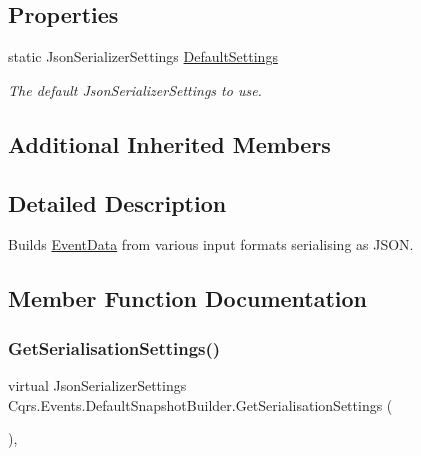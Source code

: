 \subsection*{Properties}
\begin{DoxyCompactItemize}
\item 
static Json\+Serializer\+Settings \hyperlink{classCqrs_1_1Events_1_1DefaultSnapshotBuilder_ab65162b37e4fff19014e145cf163f6ae_ab65162b37e4fff19014e145cf163f6ae}{Default\+Settings}
\begin{DoxyCompactList}\small\item\em The default Json\+Serializer\+Settings to use. \end{DoxyCompactList}\end{DoxyCompactItemize}
\subsection*{Additional Inherited Members}


\subsection{Detailed Description}
Builds \hyperlink{classCqrs_1_1Events_1_1EventData}{Event\+Data} from various input formats serialising as J\+S\+ON. 



\subsection{Member Function Documentation}
\mbox{\label{classCqrs_1_1Events_1_1DefaultSnapshotBuilder_a16686da04ea2766679fd9b04c0fa5fd2_a16686da04ea2766679fd9b04c0fa5fd2}} 
\subsubsection{\texorpdfstring{Get\+Serialisation\+Settings()}{GetSerialisationSettings()}}
{\footnotesize\ttfamily virtual Json\+Serializer\+Settings Cqrs.\+Events.\+Default\+Snapshot\+Builder.\+Get\+Serialisation\+Settings (\begin{DoxyParamCaption}{ }\end{DoxyParamCaption})\hspace{0.3cm}{\ttfamily [protected]}, {\ttfamily [virtual]}}



